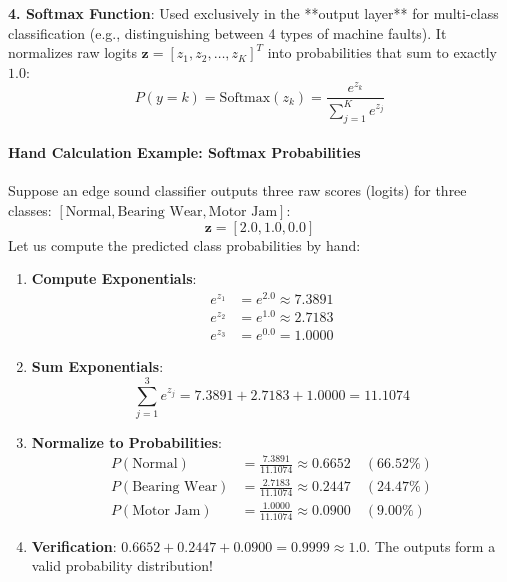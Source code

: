 \textbf{4. Softmax Function}:
Used exclusively in the **output layer** for multi-class classification (e.g., distinguishing between 4 types of machine faults). It normalizes raw logits $\mathbf{z} = [z_1, z_2, \dots, z_K]^T$ into probabilities that sum to exactly $1.0$:
\begin{equation}
P(y = k) = \text{Softmax}(z_k) = \frac{e^{z_k}}{\sum_{j=1}^K e^{z_j}}\label{eq:softmax}
\end{equation}

\paragraph{Hand Calculation Example: Softmax Probabilities}
Suppose an edge sound classifier outputs three raw scores (logits) for three classes: $[\text{Normal}, \text{Bearing Wear}, \text{Motor Jam}]$:
\begin{equation*}
\mathbf{z} = [2.0, 1.0, 0.0]
\end{equation*}
Let us compute the predicted class probabilities by hand:
\begin{enumerate}
    \item \textbf{Compute Exponentials}:
    \begin{align*}
    e^{z_1} &= e^{2.0} \approx 7.3891 \\
    e^{z_2} &= e^{1.0} \approx 2.7183 \\
    e^{z_3} &= e^{0.0} = 1.0000
    \end{align*}
    \item \textbf{Sum Exponentials}:
    \begin{equation*}
    \sum_{j=1}^3 e^{z_j} = 7.3891 + 2.7183 + 1.0000 = 11.1074
    \end{equation*}
    \item \textbf{Normalize to Probabilities}:
    \begin{align*}
    P(\text{Normal}) &= \frac{7.3891}{11.1074} \approx \mathbf{0.6652} \quad (66.52\%) \\
    P(\text{Bearing Wear}) &= \frac{2.7183}{11.1074} \approx \mathbf{0.2447} \quad (24.47\%) \\
    P(\text{Motor Jam}) &= \frac{1.0000}{11.1074} \approx \mathbf{0.0900} \quad (9.00\%)
    \end{align*}
    \item \textbf{Verification}: $0.6652 + 0.2447 + 0.0900 = 0.9999 \approx 1.0$. The outputs form a valid probability distribution!
\end{enumerate}

